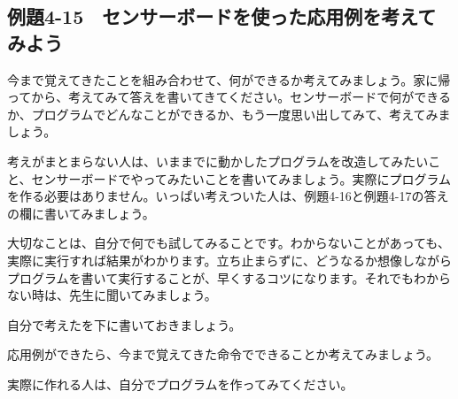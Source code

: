 \newpage
\subsection{例題4-15　センサーボードを使った応用例を考えてみよう}


\begin{description}
    \item {}
\end{description}

今まで覚えてきたことを組み合わせて、何ができるか考えてみましょう。家に帰ってから、考えてみて答えを書いてきてください。センサーボードで何ができるか、プログラムでどんなことができるか、もう一度思い出してみて、考えてみましょう。

考えがまとまらない人は、いままでに動かしたプログラムを改造してみたいこと、センサーボードでやってみたいことを書いてみましょう。実際にプログラムを作る必要はありません。いっぱい考えついた人は、例題4-16と例題4-17の答えの欄に書いてみましょう。

大切なことは、自分で何でも試してみることです。わからないことがあっても、実際に実行すれば結果がわかります。立ち止まらずに、どうなるか想像しながらプログラムを書いて実行することが、早くするコツになります。それでもわからない時は、先生に聞いてみましょう。

\begin{description}
    \item {}
\end{description}

自分で考えたを下に書いておきましょう。

応用例ができたら、今まで覚えてきた命令でできることか考えてみましょう。

実際に作れる人は、自分でプログラムを作ってみてください。




